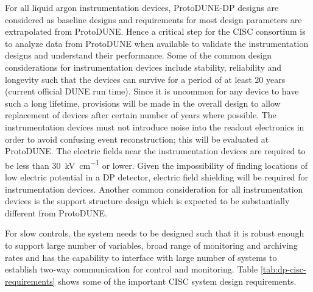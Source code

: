 For all liquid argon instrumentation devices, ProtoDUNE-DP designs are
considered as baseline designs and requirements for most design
parameters are extrapolated from ProtoDUNE. Hence a critical step for
the CISC consortium is to analyze data from ProtoDUNE when available
to validate the instrumentation designs and understand their
performance. Some of the common design considerations for
instrumentation devices include stability, reliability and longevity
such that the devices can survive for a period of at least 20 years
(current official DUNE run time).  Since it is uncommon for any device
to have such a long lifetime, provisions will be made in the overall
design to allow replacement of devices after certain number of
years where possible.
The instrumentation devices must not introduce noise into the readout electronics in order to avoid confusing event reconstruction; this will be evaluated at ProtoDUNE.
The electric fields near the instrumentation devices are required
to be less than \SI{30}{kV\per\cm} or lower. Given the impossibility
of finding locations of low electric potential in a DP detector,
electric field shielding will be required for instrumentation
devices. Another common consideration for all instrumentation devices
is the support structure design which is expected to be substantially
different from ProtoDUNE.

For slow controls, the system needs to be designed such that it is
robust enough to support large number of variables, broad range of
monitoring and archiving rates and has the capability to interface
with large number of systems to establish two-way communication for
control and monitoring. Table \ref{tab:dp-cisc-requirements} shows
some of the important CISC system design requirements.




